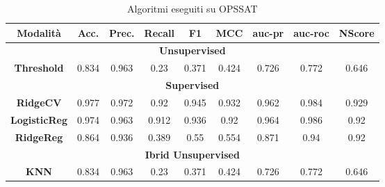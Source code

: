 \begin{table}[h]
    \centering %
    \begin{adjustbox}{max width=\textwidth}
        \begin{tabular}{|c|c|c|c|c|c|c|c|c|}
        \hline
        \textbf{Modalità} & \textbf{Acc.} &\textbf{Prec.}  & \textbf{Recall} & \textbf{F1} & \textbf{MCC} & \textbf{auc-pr} & \textbf{auc-roc} & \textbf{NScore}\\
        \hline
        \multicolumn{9}{|c|}{\textbf{Unsupervised}} \\
        \hline
        \textbf{Threshold} & 0.834 & 0.963 & 0.23 &0.371  & 0.424 & 0.726& 0.772 &0.646 \\
        \hline
        \multicolumn{9}{|c|}{\textbf{Supervised}} \\
        \hline
         \textbf{RidgeCV} & 0.977 & 0.972 & 0.92 &0.945  & 0.932 & 0.962& 0.984 &0.929 \\
        \hline
        \textbf{LogisticReg} & 0.974 & 0.963 & 0.912 &0.936  & 0.92 & 0.964& 0.986 &0.92 \\
        \hline
        \textbf{RidgeReg} & 0.864 & 0.936 & 0.389 &0.55  & 0.554 & 0.871& 0.94 &0.92 \\
        \hline
        \multicolumn{9}{|c|}{\textbf{Ibrid Unsupervised}} \\
        \hline
        \textbf{KNN} & 0.834 & 0.963 & 0.23 &0.371  & 0.424 & 0.726& 0.772 &0.646 \\
        \hline
        \end{tabular}
    \end{adjustbox}
    \caption{Algoritmi eseguiti su OPS\textunderscore SAT}
    \label{tab:RocketOPS_SAT}
\end{table}
